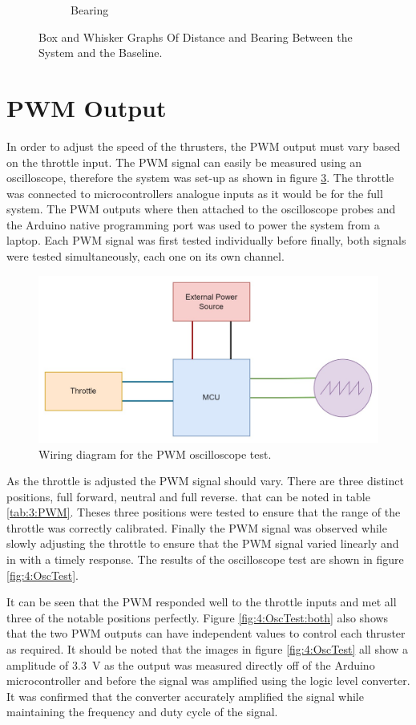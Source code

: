 \begin{figure}
\begin{center}
\begin{subfigure}{0.475\linewidth}
 			\caption{Bearing}
 			\label{fig:4:bearingBxWh}	
 		\end{subfigure}
 	\caption{Box and Whisker Graphs Of Distance and Bearing Between the System and the Baseline.}
 	\end{center}
 \end{figure} 
\section{PWM Output}
In order to adjust the speed of the thrusters, the PWM output must vary based on the throttle input. The PWM signal can easily be measured using an oscilloscope, therefore the system was set-up as shown in figure \ref{fig:4:PWMTest}. The throttle was connected to microcontrollers analogue inputs as it would be for the full system. The PWM outputs where then attached to the oscilloscope probes and the Arduino native programming port was used to power the system from a laptop. Each PWM signal was first tested individually before finally, both signals were tested simultaneously, each one on its own channel. \par
\begin{figure}
	\begin{center}
		\includegraphics[width=0.6\linewidth]{figures/PWMtest.jpg}
		\caption{Wiring diagram for the PWM oscilloscope test.}
		\label{fig:4:PWMTest}
	\end{center}
\end{figure}
As the throttle is adjusted the PWM signal should vary. There are three distinct positions, full forward, neutral and full reverse. that can be noted in table \ref{tab:3:PWM}. Theses three positions were tested to ensure that the range of the throttle was correctly calibrated. Finally the PWM signal was observed while slowly adjusting the throttle to ensure that the PWM signal varied linearly and in with a timely response. The results of the oscilloscope test are shown in figure \ref{fig:4:OscTest}. \par
It can be seen that the PWM responded well to the throttle inputs and met all three of the notable positions perfectly. Figure \ref{fig:4:OscTest:both} also shows that the two PWM outputs can have independent values to control each thruster as required. It should be noted that the images in figure \ref{fig:4:OscTest} all show a amplitude of \SI{3.3}{\volt} as the output was measured directly off of the Arduino microcontroller and before the signal was amplified using the logic level converter. It was confirmed that the converter accurately amplified the signal while maintaining the frequency and duty cycle of the signal.

